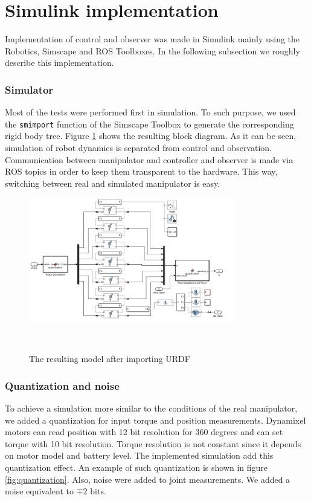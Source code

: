 \documentclass[a4paper, 10pt]{article}
\begin{document}
\section{Simulink implementation}
\label{sec:implementation}
Implementation of control and observer was made in Simulink mainly using the Robotics, Simscape and ROS Toolboxes. In the following subsection we roughly describe this implementation.

\subsubsection*{Simulator}
Most of the tests were performed first in simulation. To such purpose, we used the \texttt{smimport} function of the Simscape Toolbox to generate the corresponding rigid body tree. Figure \ref{fig:SimulinkModel} shows the resulting block diagram. As it can be seen, simulation of robot dynamics is separated from control and observation. Communication between manipulator and controller and observer is made via ROS topics in order to keep them transparent to the hardware. This way, switching between real and simulated manipulator is easy.

\begin{figure}
  \centering
  \includegraphics[width=0.8\textwidth]{Figures/ManipulatorModel.png}
  \caption{The resulting model after importing URDF}\
  \label{fig:SimulinkModel}
\end{figure}

\subsubsection*{Quantization and noise}
To achieve a simulation more similar to the conditions of the real manipulator, we added a quantization for input torque and position measurements. Dynamixel motors can read position with 12 bit resolution for 360 degrees and can set torque with 10 bit resolution. Torque resolution is not constant since it depends on motor model and battery level. The implemented simulation add this quantization effect. An example of such quantization is shown in figure \ref{fig:quantization}. Also, noise were added to joint measurements. We added a noise equivalent to $\mp 2$ bits. 
\end{document}
